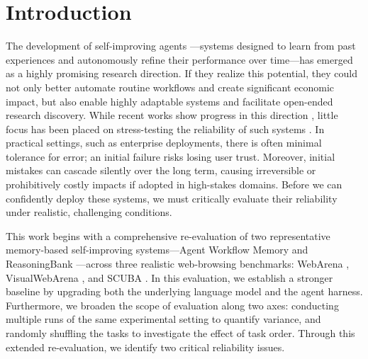 \documentclass{article}
\begin{document}

\section{Introduction}
The development of self-improving agents \cite{schmidhuber2006goedelmachinesselfreferentialuniversal,zelikman2022star,huang-etal-2023-large}—systems designed to learn from past experiences and autonomously refine their performance over time—has emerged as a highly promising research direction. If they realize this potential, they could not only better automate routine workflows and create significant economic impact, but also enable highly adaptable systems and facilitate open-ended research discovery. While recent works show progress in this direction \cite{zhuge2024gptswarm,hu2025automated,zhou2026selfchallenging,fang-etal-2025-webevolver,murty2025nnetscape,zheng2025skillweaverwebagentsselfimprove}, little focus has been placed on stress-testing the reliability of such systems \cite{rabanser2026scienceaiagentreliability}. 
In practical settings, such as enterprise deployments, there is often minimal tolerance for error; an initial failure risks losing user trust. 
Moreover, initial mistakes can cascade silently over the long term, causing irreversible or prohibitively costly impacts if adopted in high-stakes domains.
Before we can confidently deploy these systems, we must critically evaluate their reliability under realistic, challenging conditions.

This work begins with a comprehensive re-evaluation of two representative memory-based self-improving systems—Agent Workflow Memory \cite{wang2025agent} and ReasoningBank \cite{ouyang2025reasoningbankscalingagentselfevolving}—across three realistic web-browsing benchmarks: WebArena \cite{zhou2024webarena}, VisualWebArena \cite{koh-etal-2024-visualwebarena}, and SCUBA \cite{dai2025scubasalesforcecomputeruse}. In this evaluation, we establish a stronger baseline by upgrading both the underlying language model and the agent harness. Furthermore, we broaden the scope of evaluation along two axes: conducting multiple runs of the same experimental setting to quantify variance, and randomly shuffling the tasks to investigate the effect of task order. Through this extended re-evaluation, we identify two critical reliability issues.
\end{document}
